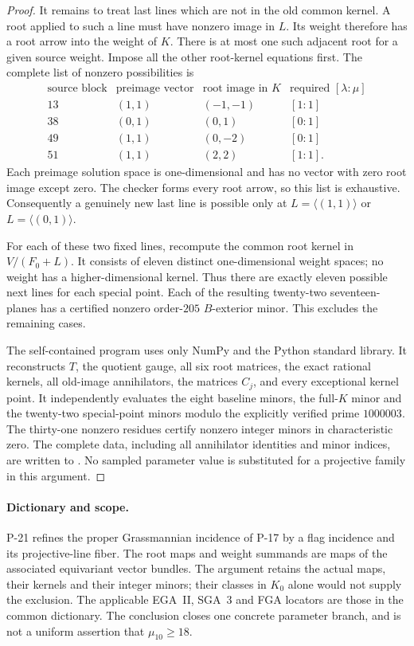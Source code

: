 \begin{proof}
It remains to treat last lines which are not in the
old common kernel. A root applied to such a line must
have nonzero image in $L$. Its weight therefore has
a root arrow into the weight of $K$. There is at most
one such adjacent root for a given source weight.
Impose all the other root-kernel equations first.
The complete list of nonzero possibilities is
\[
\begin{array}{c|c|c|c}
\text{source block}&\text{preimage vector}
 &\text{root image in }K&\text{required }[\lambda:\mu]\\\hline
13&(1,1)&(-1,-1)&[1:1]\\
38&(0,1)&(0,1)&[0:1]\\
49&(1,1)&(0,-2)&[0:1]\\
51&(1,1)&(2,2)&[1:1].
\end{array}
\]
Each preimage solution space is one-dimensional and
has no vector with zero root image except zero. The
checker forms every root arrow, so this list is
exhaustive. Consequently a genuinely new last line
is possible only at $L=\langle(1,1)\rangle$ or
$L=\langle(0,1)\rangle$.

For each of these two fixed lines, recompute the
common root kernel in $V/(F_0+L)$. It consists of
eleven distinct one-dimensional weight spaces; no
weight has a higher-dimensional kernel. Thus there
are exactly eleven possible next lines for each
special point. Each of the resulting twenty-two
seventeen-planes has a certified nonzero order-$205$
$B$-exterior minor. This excludes the remaining cases.

The self-contained program
 uses only NumPy
and the Python standard library. It reconstructs
$T$, the quotient gauge, all six root matrices,
the exact rational kernels, all old-image annihilators,
the matrices $C_j$, and every exceptional kernel point.
It independently evaluates the eight baseline minors,
the full-$K$ minor and the twenty-two special-point
minors modulo the explicitly verified prime $1000003$.
The thirty-one nonzero residues certify nonzero integer
minors in characteristic zero. The complete data,
including all annihilator identities and minor indices,
are written to .
No sampled parameter value is substituted for a
projective family in this argument.
\end{proof}

\paragraph{Dictionary and scope.}
P-21 refines the proper Grassmannian incidence of P-17
by a flag incidence and its projective-line fiber.
The root maps and weight summands are maps of the
associated equivariant vector bundles. The argument
retains the actual maps, their kernels and their
integer minors; their classes in $K_0$ alone would
not supply the exclusion. The applicable EGA~II,
SGA~3 and FGA locators are those in the common dictionary.
The conclusion closes one concrete parameter branch,
and is not a uniform assertion that $\mu_{10}\geq18$.
